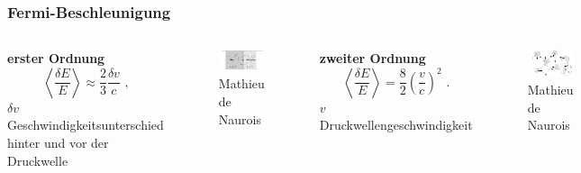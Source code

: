 \documentclass[aspectratio=1610, professionalfonts, 9pt]{beamer}
\begin{document}
  \begin{frame}
    \frametitle{Fermi-Beschleunigung}
    \begin{columns}
      \textbf{erster Ordnung}
      \begin{equation*}
        \left\langle \frac{\delta E}{E} \right\rangle \approx \frac{2}{3}\frac{\delta v}{c} \text{ ,}
      \end{equation*}
      $\delta v$ Geschwindigkeitsunterschied hinter und vor der Druckwelle
      \begin{figure}
        \includegraphics[width=\textwidth]{pictures/firstorderFermi.JPG}
        \caption{Mathieu de Naurois}
        \label{}
      \end{figure}
      \textbf{zweiter Ordnung}
      \begin{equation*}
        \left\langle \frac{\delta E}{E} \right\rangle = \frac{8}{2}\left(\frac{v}{c}\right)^2\text{ .}
      \end{equation*}
      $v$ Druckwellengeschwindigkeit
      \begin{figure}
        \includegraphics[width=\textwidth]{pictures/secondorderFermi.JPG}
        \caption{Mathieu de Naurois}
        \label{}
      \end{figure}
    \end{columns}
  \end{frame}
\end{document}
